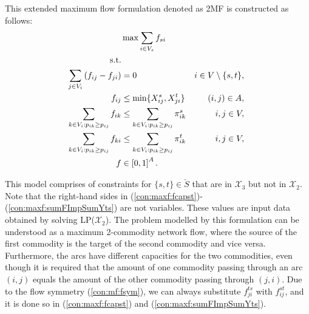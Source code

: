 This extended maximum flow formulation denoted as 2MF is constructed as follows:
\newline
\newline  
\begin{subequations}\label{eq:mf}
\begin{align}
\label{objective:maxf} &\max\sum\limits_{i \in V_s} f_{si} \\ 
\text{s.t.}  \notag   \\
\label{con:maxf:flowNormal}  \sum\limits_{\substack{ j\in V_i}}\left(f_{ij}-f_{ji}\right) & = 0 & i\in V\setminus\{s,t\},\\
\label{con:maxf:fcapst}   f_{ij} &\leq \min\{X_{ij}^s, X_{ji}^t\}     &  (i,j)\in A,  \\ 	 
\label{con:maxf:sumFImpSumYst} \sum\limits_{k\in V_i:p_{ik}\geq p_{ij}}f_{ik} & \leq \sum\limits_{k\in V_i:p_{ik}\geq p_{ij}}  \pi^{s}_{ik} & i,j\in V,\\
\label{con:maxf:sumFImpSumYts} \sum\limits_{k\in V_i:p_{ik}\geq p_{ij}}f_{ki} & \leq \sum\limits_{k\in V_i:p_{ik}\geq p_{ij}}  \pi^{t}_{ik} &  i,j\in V,\\
\label{con:maxf:fdim}f&\in\left[0,1\right]^{A}. 
\end{align}~
\end{subequations}  
  
This model comprises of constraints for $\{s,t\}\in\check{S}$ that are in $\mathcal{X}_3$ but not in $\mathcal{X}_2$.
Note that the right-hand sides in (\ref{con:maxf:fcapst})-(\ref{con:maxf:sumFImpSumYts}) are not variables.
These values are input data obtained by solving LP($\mathcal{X}_2$).
The problem modelled by this formulation can be understood as a maximum 2-commodity network flow, where the source of the first commodity is the target of the second commodity and vice versa.
Furthermore, the arcs have different capacities for the two commodities, even though it is required that the amount of one commodity passing through an arc $(i,j)$ equals the amount of the other commodity passing through $(j,i)$.
Due to the flow symmetry (\ref{con:mf:fsym}), we can always substitute $f^{ts}_{ji}$ with $f^{st}_{ij}$, and it is done so in (\ref{con:maxf:fcapst}) and (\ref{con:maxf:sumFImpSumYts}).
 
